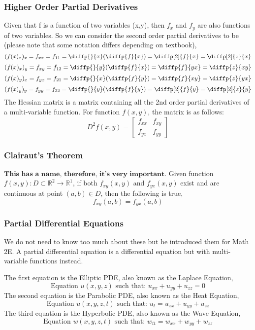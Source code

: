 \documentclass{article}
\begin{document}
\subsubsection{Higher Order Partial Derivatives}
Given that f is a function of two variables (x,y), then $f_x$ and $f_y$ are also functions of two variables. So we can consider the second order partial derivatives to be (please note that some notation differs depending on textbook),
$$(f(x)_x)_x = f_{xx} = f_{11} = \diffp{}{x}(\diffp{f}{x}) = \diffp[2]{f}{x} = \diffp[2]{z}{x}$$
$$(f(x)_x)_y = f_{xy} = f_{12} = \diffp{}{y}(\diffp{f}{x}) = \diffp{f}{{y}{x}} = \diffp{z}{{x}{y}}$$
$$(f(x)_y)_x = f_{yx} = f_{21} = \diffp{}{x}(\diffp{f}{y}) = \diffp{f}{{x}{y}} = \diffp{z}{{y}{x}}$$
$$(f(x)_y)_y = f_{yy} = f_{22} = \diffp{}{y}(\diffp{f}{y}) = \diffp[2]{f}{y} = \diffp[2]{z}{y}$$
The Hessian matrix is a matrix containing all the 2nd order partial derivatives of a multi-variable function. For function $f(x,y)$, the matrix is as follows:
$$D^2f(x,y) = 
\left[ \begin{matrix}
f_{xx} & f_{xy} \\
f_{yx} & f_{yy}
\end{matrix} \right]$$

\subsubsection{Clairaut's Theorem}
$\textbf{This has a name, therefore, it's very important.}$ Given function $f(x,y): D \subset \mathbb{R}^2 \longrightarrow \mathbb{R}^1$, if both $f_{xy}(x,y)$ and $f_{yx}(x,y)$ exist and are continuous at point $(a,b) \in D$, then the following is true,
$$f_{xy}(a,b) = f_{yx}(a,b)$$

\subsubsection{Partial Differential Equations}
We do not need to know too much about these but he introduced them for Math 2E. A partial differential equation is a differential equation but with multi-variable functions instead. 

The first equation is the Elliptic PDE, also known as the Laplace Equation,
$$\text{Equation } u(x,y,z) \text{ such that: } u_{xx} + u_{yy} + u_{zz} = 0$$
The second equation is the Parabolic PDE, also known as the Heat Equation,
$$\text{Equation } u(x,y,z,t) \text{ such that: } u_t = u_{xx} + u_{yy} + u_{zz}$$
The third equation is the Hyperbolic PDE, also known as the Wave Equation,
$$\text{Equation } w(x,y,z,t) \text{ such that: } w_{tt} = w_{xx} + w_{yy} + w_{zz}$$
\end{document}
